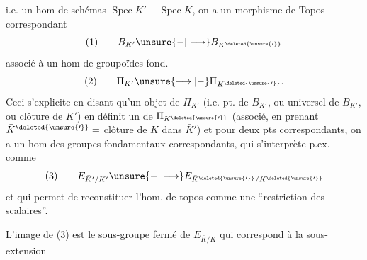 i.e. un hom de schémas $\operatorname{Spec}K' - \operatorname{Spec}K$, on a un morphisme de Topos correspondant
\[
(1)\qquad B_{K'}\unsure{-|\longrightarrow}B_{K^{\deleted{\unsure{\prime}}}}
\]
associé à un hom de groupoïdes fond.
\[
(2)\qquad \Pi_{K'}\unsure{\longrightarrow|-}\Pi_{K^{\deleted{\unsure{\prime}}}}.
\]
Ceci s'explicite en disant qu'un  objet de $\Pi_{K'}$ (i.e. pt. de $B_{K'}$, ou  universel de $B_{K'}$, \deleted{)} ou clôture  de $K'$) en définit un de $\Pi_{K^{\deleted{\unsure{\prime}}}}$ (associé, en prenant $\bar K^{\deleted{\unsure{\prime}}}=$ clôture  de $K$ dans $\bar K'$) et pour deux pts correspondants, on a un hom des groupes fondamentaux correspondants, qui s'interprète p.ex. comme
\[
(3)\qquad E_{\bar K'/K'}\unsure{-|\longrightarrow}E_{\bar K^{\deleted{\unsure{\prime}}}/K^{\deleted{\unsure{\prime}}}}
\]
et qui permet de reconstituer l'hom. de topos comme une ``restriction des scalaires''.

L'image de (3) est le sous-groupe fermé de $E_{\bar K/K}$ qui correspond à la sous-extension
